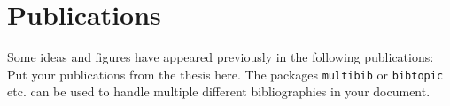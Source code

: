 

\chapter*{Publications} %

Some ideas and figures have appeared previously in the following publications:\\

\noindent Put your publications from the thesis here. The packages \texttt{multibib} or \texttt{bibtopic} etc. can be used to handle multiple different bibliographies in your document.


